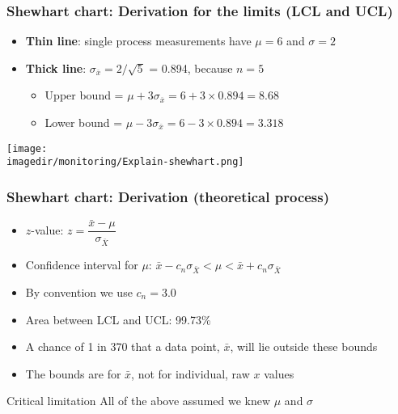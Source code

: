 \begin{frame}\frametitle{Shewhart chart: Derivation for the limits (LCL and UCL)}
	\begin{itemize}
		\item	\textbf{Thin line}: single process measurements have $\mu = 6$ and $\sigma = 2$
		\item	\textbf{Thick line}: $\sigma_{\overline{x}} = 2/\sqrt{5}$ = 0.894, because $n=5$
		\begin{itemize}
			\item	Upper bound = $\mu + 3\sigma_{\overline{x}} = 6 + 3\times 0.894 = 8.68$
			\item	Lower bound = $\mu - 3\sigma_{\overline{x}} = 6 - 3\times 0.894 = 3.318$
		\end{itemize}
	\end{itemize}

	\begin{center}
		\texttt{[image: \\imagedir/monitoring/Explain-shewhart.png]}
	\end{center}
\end{frame}

\begin{frame}\frametitle{Shewhart chart: Derivation (theoretical process)}
	\begin{itemize}
		\item	$z$-value: $z = \dfrac{\bar{x} - \mu}{\sigma_{\bar{X}}}$
	\end{itemize}
	\begin{itemize}
		\item	Confidence interval for $\mu$: $\bar{x} - c_n\sigma_{\bar{X}} < \mu < \bar{x} + c_n\sigma_{\bar{X}}$
	\end{itemize}
	\begin{itemize}
		\item	By convention we use $c_n = 3.0$
		\item	Area between LCL and UCL: 99.73\%
		\item	A chance of 1 in 370 that a data point, $\bar{x}$, will lie outside these bounds
		\item	The bounds are for $\bar{x}$, not for individual, raw $x$ values
	\end{itemize}
	\begin{exampleblock}{Critical limitation}
		All of the above assumed we knew $\mu$ and $\sigma$
	\end{exampleblock}
\end{frame}

